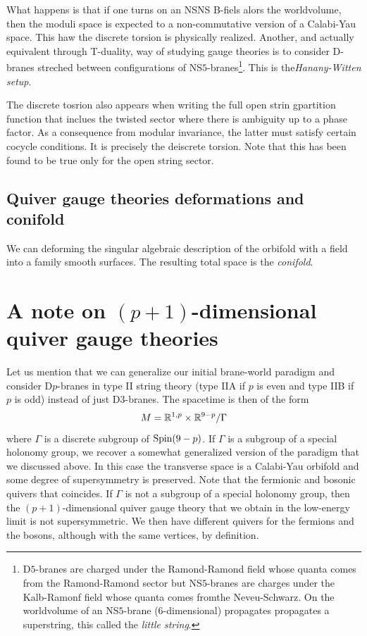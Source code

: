        What happens is that if one turns on an NSNS B-fiels alors the worldvolume, then the moduli space is expected to a non-commutative version of a Calabi-Yau space. This haw the discrete torsion is physically realized. Another, and actually equivalent through T-duality, way of studying gauge theories is to consider D-branes streched between configurations of NS$5$-branes\footnote{D$5$-branes are charged under the Ramond-Ramond field whose quanta comes from the Ramond-Ramond sector but NS$5$-branes are charges under the Kalb-Ramonf field whose quanta comes fromthe Neveu-Schwarz. On the worldvolume of an NS$5$-brane (6-dimensional) propagates propagates a superstring, this called the \emph{little string}.}. This is the\emph{Hanany-Witten setup}.

        The discrete tosrion also appears when writing the full open strin gpartition function that inclues the twisted sector where there is ambiguity up to a phase factor. As a consequence from modular invariance, the latter must satisfy certain cocycle conditions. It is precisely the deiscrete torsion. Note that this has been found to be true only for the open string sector.

    \subsection{Quiver gauge theories deformations and conifold}

        We can deforming the singular algebraic description of the orbifold with a field into a family smooth surfaces. The resulting total space is the \emph{conifold}.

\section{A note on $(p+1)$-dimensional quiver gauge theories}

    Let us mention that we can generalize our initial brane-world paradigm and consider D$p$-branes in type II string theory (type IIA if $p$ is even and type IIB if $p$ is odd) instead of just D$3$-branes. The spacetime is then of the form
    \begin{equation}
        M = \mathbb{R}^{1,p}\times\mathbb{R}^{9-p}/\Gamma
    \end{equation}
    where $\Gamma$ is a discrete subgroup of $\text{Spin}(9-p)$. If $\Gamma$ is a subgroup of a special holonomy group, we recover a somewhat generalized version of the paradigm that we discussed above. In this case the transverse space is a Calabi-Yau orbifold and some degree of supersymmetry is preserved. Note that the fermionic and bosonic quivers that coincides. If $\Gamma$ is not a subgroup of a special holonomy group, then the $(p+1)$-dimensional quiver gauge theory that we obtain in the low-energy limit is not supersymmetric. We then have different quivers for the fermions and the bosons, although with the same vertices, by definition.

